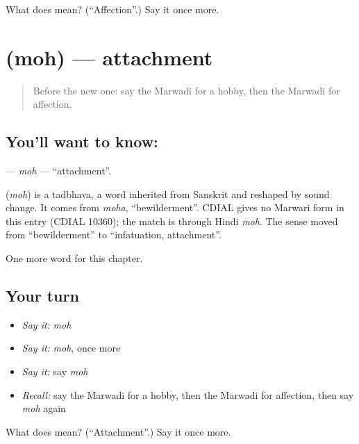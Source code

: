 \begin{tcolorbox}[breakable,colback=teal!4,colframe=teal!35!black,title={Before you move on}]
What does  mean? (\textquotedblleft{}Affection\textquotedblright{}.) Say it once more.
\end{tcolorbox}
\section[\texorpdfstring{\mw{मोह} (moh)}{मोह (moh)}]{ (moh) — attachment}

\label{lesson:MW-C113-moh}



\begin{quote}
Before the new one: say the Marwadi for a hobby, then the Marwadi for affection.
\end{quote}

\subsection*{You'll want to know: }
\textbf{} — \emph{moh} — \textquotedblleft{}attachment\textquotedblright{}.

\begin{cousinweb}
\textbf{} (\emph{moh}) is a tadbhava, a word inherited from Sanskrit and reshaped by sound change. It comes from \emph{moha}, \textquotedblleft{}bewilderment\textquotedblright{}. CDIAL gives no Marwari form in this entry (CDIAL 10360); the match is through Hindi \emph{moh}. The sense moved from \textquotedblleft{}bewilderment\textquotedblright{} to \textquotedblleft{}infatuation, attachment\textquotedblright{}.
\end{cousinweb}

\begin{grammarlens}[title={What you've built}]
One more word for this chapter.
\end{grammarlens}

\subsection*{Your turn}
\begin{itemize}
\raggedright
  \item \emph{Say it:} \emph{moh}
  \item \emph{Say it:} \emph{moh}, once more
  \item \emph{Say it:} say \emph{moh}
  \item \emph{Recall:} say the Marwadi for a hobby, then the Marwadi for affection, then say \emph{moh} again
\end{itemize}

\begin{tcolorbox}[breakable,colback=teal!4,colframe=teal!35!black,title={Before you move on}]
What does  mean? (\textquotedblleft{}Attachment\textquotedblright{}.) Say it once more.
\end{tcolorbox}
